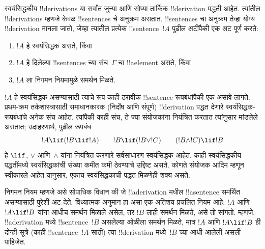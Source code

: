 \documentclass[../../../include/open-logic-section]{subfiles}
\begin{document}
      {}
      {}


स्वयंसिद्धकीय !!{derivation}s या सर्वांत जुन्या आणि सोप्या तार्किक
!!{derivation} पद्धती आहेत. त्यांतील !!{derivation}s म्हणजे केवळ
!!{sentence}s चे अनुक्रम असतात. !!{sentence}s चा अनुक्रम तेव्हा योग्य
!!{derivation} मानला जातो, जेव्हा त्यातील प्रत्येक !!{sentence}~$!A$ पुढील
अटींपैकी एक अट पूर्ण करते:
\begin{enumerate}
\item $!A$ हे स्वयंसिद्धक असते, किंवा
\item $!A$ हे दिलेल्या !!{sentence}s च्या संच~$\Gamma$ चा !!a{element} असते, किंवा
\item $!A$ ला निगमन नियमामुळे समर्थन मिळते.
\end{enumerate}
$!A$ हे स्वयंसिद्धक असण्यासाठी त्याचे रूप काही ठरावीक !!{sentence}
रूपबंधांपैकी एक असावे लागते. प्रथम-क्रम तर्कशास्त्रासाठी समाधानकारक
(निर्दोष आणि संपूर्ण) !!{derivation} पद्धत देणारे स्वयंसिद्धक-रूपबंधांचे
अनेक संच आहेत. त्यांपैकी काही संच, ते ज्या संयोजकांना नियंत्रित करतात
त्यांनुसार मांडलेले असतात; उदाहरणार्थ, पुढील रूपबंध
\[
!A \lif (!B \lif !A) \qquad !B \lif (!B \lor !C) \qquad (!B \land !C) \lif !B
\]
हे $\lif$, $\lor$ आणि~$\land$ यांना नियंत्रित करणारे सर्वसाधारण स्वयंसिद्धक
आहेत. काही स्वयंसिद्धकीय पद्धतींमध्ये स्वयंसिद्धकांची संख्या कमीत कमी
ठेवण्याचे उद्दिष्ट असते. कोणते संयोजक आदिम म्हणून स्वीकारले आहेत यानुसार,
एकाच स्वयंसिद्धकाची पद्धत मिळणेही शक्य असते.

निगमन नियम म्हणजे असे सोपाधिक विधान की जे !!a{derivation} मधील
!!a{sentence} समर्थित असण्यासाठी पुरेशी अट देते. विध्यात्मक अनुमान हा असा
एक अतिशय प्रचलित नियम आहे: $!A$ आणि $!A \lif !B$ यांना आधीच समर्थन मिळाले
असेल, तर $!B$ लाही समर्थन मिळते, असे तो सांगतो. म्हणजे, !!a{derivation}
मध्ये !!{sentence}~$!B$ असलेल्या ओळीला समर्थन मिळते, मात्र $!A$ आणि
$!A \lif !B$ ही दोन्ही सूत्रे (काही !!{sentence}~$!A$ साठी) त्या
!!{derivation} मध्ये~$!B$ च्या आधी आलेली असली पाहिजेत.
\end{document}
